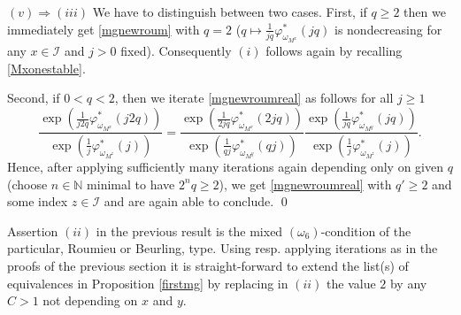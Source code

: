 \documentclass[10pt]{amsart}%
\numberwithin{equation}{section}
\theoremstyle{plain}
\newcommand{\NN}{\mathbb{N}}
\begin{document}
$(v)\Rightarrow(iii)$ We have to distinguish between two cases. First, if $q\ge 2$ then we immediately get \eqref{mgnewroum} with $q=2$ ($q\mapsto\frac{1}{jq}\varphi^{*}_{\omega_{M^x}}(jq)$ is nondecreasing for any $x\in\mathcal{I}$ and $j>0$ fixed). Consequently $(i)$ follows again by recalling  \eqref{Mxonestable}.

Second,  if $0<q<2$, then we iterate \eqref{mgnewroumreal} as follows for all $j\ge 1$
$$\frac{\exp(\frac{1}{j2q}\varphi^{*}_{\omega_{M^x}}(j2q))}{\exp(\frac{1}{j}\varphi^{*}_{\omega_{M^z}}(j))}=\frac{\exp(\frac{1}{2jq}\varphi^{*}_{\omega_{M^x}}(2jq))}{\exp(\frac{1}{qj}\varphi^{*}_{\omega_{M^y}}(qj))}\frac{\exp(\frac{1}{jq}\varphi^{*}_{\omega_{M^y}}(jq))}{\exp(\frac{1}{j}\varphi^{*}_{\omega_{M^z}}(j))}.$$
Hence, after applying sufficiently many iterations again depending only on given $q$ (choose $n\in\NN$ minimal to have $2^n q\ge 2$), we get \eqref{mgnewroumreal} with $q'\ge 2$ and some index $z\in\mathcal{I}$ and are again able to conclude.
\qed\enddemo

Assertion $(ii)$ in the previous result is the mixed \hyperlink{om6}{$(\omega_6)$}-condition of the particular, Roumieu or Beurling, type. Using resp. applying iterations as in the proofs of the previous section it is straight-forward to extend the list(s) of equivalences in Proposition \ref{firstmg} by replacing in $(ii)$ the value $2$ by any $C>1$ not depending on $x$ and $y$.
\end{document}
